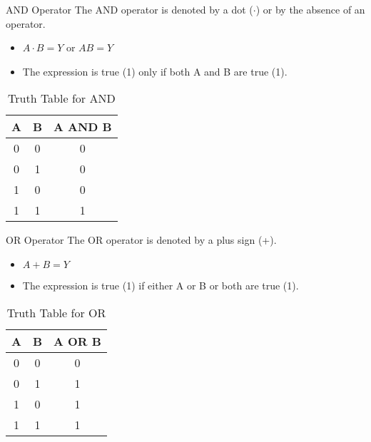 \documentclass{beamer}
\begin{document}
\begin{frame}{AND Operator}
    The AND operator is denoted by a dot ($\cdot$) or by the absence of an
    operator.
    \begin{itemize}
        \item $A \cdot B = Y$ or $AB = Y$
        \item The expression is true (1) only if both A and B are true (1).
    \end{itemize}
    \begin{table}
        \centering
        \begin{tabular}{|c|c|c|}
            \hline
            \textbf{A} & \textbf{B} & \textbf{A AND B} \\
            \hline
            0 & 0 & 0 \\
            0 & 1 & 0 \\
            1 & 0 & 0 \\
            1 & 1 & 1 \\
            \hline
        \end{tabular}
        \caption{Truth Table for AND}
    \end{table}
\end{frame}

\begin{frame}{OR Operator}
    The OR operator is denoted by a plus sign (+).
    \begin{itemize}
        \item $A + B = Y$
        \item The expression is true (1) if either A or B or both are true (1).
    \end{itemize}
    \begin{table}
        \centering
        \begin{tabular}{|c|c|c|}
            \hline
            \textbf{A} & \textbf{B} & \textbf{A OR B} \\
            \hline
            0 & 0 & 0 \\
            0 & 1 & 1 \\
            1 & 0 & 1 \\
            1 & 1 & 1 \\
            \hline
        \end{tabular}
        \caption{Truth Table for OR}
    \end{table}
\end{frame}
\end{document}
